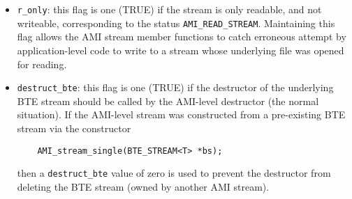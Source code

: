 \begin{itemize}
\begin{enumerate}
    \begin{itemize}
    \item \lstinline|r_only|: this flag is one (TRUE) if the stream is
      only readable, and not writeable, corresponding to the status
      \lstinline|AMI_READ_STREAM|. Maintaining this flag allows the
      AMI stream member functions to catch erroneous attempt by
      application-level code to write to a stream whose underlying
      file was opened for reading.
            
    \item \lstinline|destruct_bte|: this flag is one (TRUE) if the
      destructor of the underlying BTE stream should be called by the
      AMI-level destructor (the normal situation). If the AMI-level
      stream was constructed from a pre-existing BTE stream via the
      constructor
\begin{lstlisting}
    AMI_stream_single(BTE_STREAM<T> *bs);
\end{lstlisting}
      then a \lstinline|destruct_bte| value of zero is used
      to prevent the destructor from deleting the BTE
      stream (owned by another AMI stream).
    \end{itemize}
  \end{enumerate}
  
\end{itemize}



